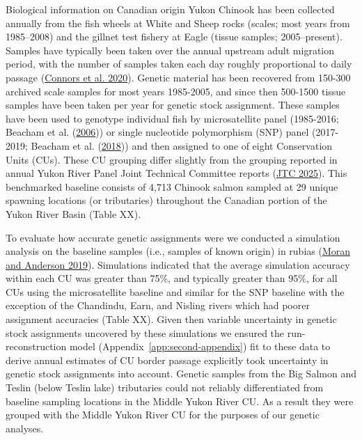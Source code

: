 \documentclass[11pt]{book}
\begin{document}
Biological information on Canadian origin Yukon Chinook has been collected annually from the fish wheels at White and Sheep rocks (scales; most years from 1985--2008) and the gillnet test fishery at Eagle (tissue samples; 2005--present). Samples have typically been taken over the annual upstream adult migration period, with the number of samples taken each day roughly proportional to daily passage (\protect\hyperlink{ref-connors_incorporating_2020}{Connors et al. 2020}). Genetic material has been recovered from 150-300 archived scale samples for most years 1985-2005, and since then 500-1500 tissue samples have been taken per year for genetic stock assignment. These samples have been used to genotype individual fish by microsatellite panel (1985-2016; Beacham et al. (\protect\hyperlink{ref-beacham2006estimation}{2006})) or single nucleotide polymorphism (SNP) panel (2017-2019; Beacham et al. (\protect\hyperlink{ref-beacham2018population}{2018})) and then assigned to one of eight Conservation Units (CUs). These CU grouping differ slightly from the grouping reported in annual Yukon River Panel Joint Technical Committee reports (\protect\hyperlink{ref-JTC2025Report}{JTC 2025}). This benchmarked baseline consists of 4,713 Chinook salmon sampled at 29 unique spawning locations (or tributaries) throughout the Canadian portion of the Yukon River Basin (Table XX).

To evaluate how accurate genetic assignments were we conducted a simulation analysis on the baseline samples (i.e., samples of known origin) in rubias (\protect\hyperlink{ref-moran2019bayesian}{Moran and Anderson 2019}). Simulations indicated that the average simulation accuracy within each CU was greater than 75\%, and typically greater than 95\%, for all CUs using the microsatellite baseline and similar for the SNP baseline with the exception of the Chandindu, Earn, and Nisling rivers which had poorer assignment accuracies (Table XX). Given then variable uncertainty in genetic stock assignments uncovered by these simulations we ensured the run-reconstruction model (Appendix~\ref{app:second-appendix}) fit to these data to derive annual estimates of CU border passage explicitly took uncertainty in genetic stock assignments into account. Genetic samples from the Big Salmon and Teslin (below Teslin lake) tributaries could not reliably differentiated from baseline sampling locations in the Middle Yukon River CU. As a result they were grouped with the Middle Yukon River CU for the purposes of our genetic analyses.


\clearpage
\end{document}
